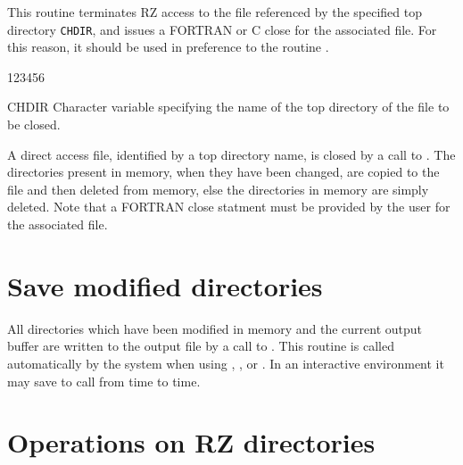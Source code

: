 This routine terminates RZ access to the file referenced
by the specified top directory {\tt CHDIR}, and issues a FORTRAN
or C close for the associated file. For this reason,
it should be used in preference to the routine .


\begin{DLtt}{123456}
\item[CHDIR]Character variable specifying the name of the top directory of the
file to be closed.
\end{DLtt}

A direct access file, identified by a top directory name,
is closed by a call to .
The directories present in memory,
when they have been changed,
are copied to the file and then deleted from memory, else
the directories in memory are simply deleted.
Note that a FORTRAN close statment must be provided by the
user for the associated file.

\section{Save modified directories}

All directories which have been modified in memory
and the current output buffer are written to the output file by a call
to . This routine is called
automatically by the system when using , 
,  or .
In an interactive environment it may save to call  from
time to time.

\section{Operations on RZ directories}
